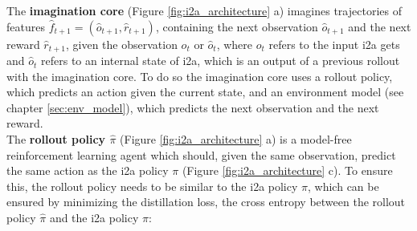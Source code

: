 
The \textbf{imagination core} (Figure \ref{fig:i2a_architecture} a) imagines trajectories of features $\hat{f}_{t+1} = (\hat{o}_{t+1}, \hat{r}_{t+1})$, containing the next observation $\hat{o}_{t+1}$ and the next reward $\hat{r}_{t+1}$, given the observation $o_t$ or $\hat{o}_{t}$, where $o_t$ refers to the input i2a gets and $\hat{o}_{t}$ refers to an internal state of i2a, which is an output of a previous rollout with the imagination core.
To do so the imagination core uses a rollout policy, which predicts an action given the current state, and an environment model (see chapter \ref{sec:env_model}), which predicts the next observation and the next reward.\\




The \textbf{rollout policy $\hat{\pi}$} (Figure \ref{fig:i2a_architecture} a) is a model-free reinforcement learning agent which should, given the same observation, predict the same action as the i2a policy $\pi$ (Figure \ref{fig:i2a_architecture} c). To ensure this, the rollout policy needs to be similar to the i2a policy $\pi$, which can be ensured by minimizing the distillation loss, the cross entropy between the rollout policy $\hat{\pi}$ and the i2a policy $\pi$:

 
